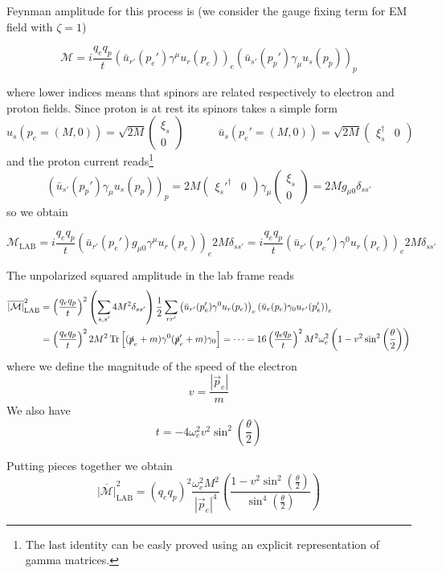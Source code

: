 \documentclass[TheoreticalPhy_ModB.tex]{subfiles}
\begin{document}
Feynman amplitude for this process is (we consider the gauge fixing term for EM field with $\zeta=1$)

\[\mathcal M=i\frac{q_eq_p}{t}\left(\bar u_{r'}(p_e')\gamma^\mu u_r(p_e)\right)_e\left(\bar u_{s'}(p_p')\gamma_\mu u_s(p_p)\right)_p\]

where lower indices means that spinors are related respectively to electron and proton fields. Since proton is at rest  its spinors takes a simple form
\[u_s(p_e=(M,0))=\sqrt {2M}\begin{pmatrix}\xi_s\\0\end{pmatrix}
\qquad\quad
\bar u_s(p_e'=(M,0))=\sqrt {2M}\begin{pmatrix}\xi_s^\dagger&0\end{pmatrix}\]
and the proton current reads\footnote{The last identity can be easly proved using an explicit representation of gamma matrices.}
\[\left(\bar u_{s'}(p_p')\gamma_\mu u_s(p_p)\right)_p=2M\begin{pmatrix}\xi_s'^\dagger&0\end{pmatrix}\gamma_\mu\begin{pmatrix}\xi_s\\0\end{pmatrix}=2Mg_{\mu0}\delta_{ss'}\]
so we obtain

\[\mathcal M_{\text{LAB}}=i\frac{q_eq_p}{t}\left(\bar u_{r'}(p_e')g_{\mu0}\gamma^\mu u_r(p_e)\right)_e2M\delta_{ss'}=i\frac{q_eq_p}{t}\left(\bar u_{r'}(p_e')\gamma^0 u_r(p_e)\right)_e2M\delta_{ss'}\]

The unpolarized squared amplitude in the lab frame reads
\begin{align*}
\overline{|\mathcal M|}^2_{\text{LAB}}
&=\left(\frac{q_eq_p}{t}\right)^2\left(\sum_{s,s'}4M^2\delta_{ss'}\right)\frac12\sum_{rr'}\left(\bar u_{r'}(p_e')\gamma^0 u_r(p_e)\right)_e\left(\bar u_{r}(p_e)\gamma_0 u_{r'}(p_e')\right)_e\\
&=\left(\frac{q_eq_p}{t}\right)^22M^2\Tr\left[(\slashed p_e+m)\gamma^0(\slashed p_e'+m)\gamma_0\right]=\dots
=16\left(\frac{q_eq_p}{t}\right)^2M^2\omega_e^2\left(1-v^2\sin^2\left(\frac\theta2\right)\right)\end{align*}
where we define the magnitude of the speed of the electron
\[v=\frac{|\vec p_e|}m\]
We also have 
\[t=-4\omega_e^2v^2\sin^2\left(\frac\theta2\right)\]

Putting pieces together we obtain
\[\overline{|\mathcal M|}^2_{\text{LAB}}
=(q_eq_p)^2\frac{\omega_e^2M^2}{|\vec p_e|^4}\left(\frac{1-v^2\sin^2\left(\frac\theta2\right)}{\sin^4\left(\frac\theta2\right)}\right)\]
\end{document}
